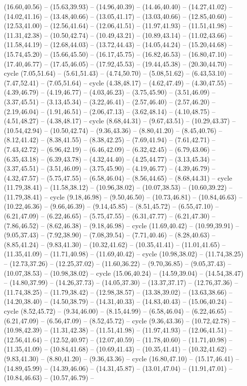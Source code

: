 {(16.60,40.56) -- (15.63,39.93) -- (14.96,40.39) -- (14.46,40.40) -- (14.27,41.02) -- (14.02,41.16) -- (13.48,40.66) -- (13.05,41.17) -- (13.03,40.66) -- (12.85,40.60) -- (12.53,41.00) -- (12.56,41.64) -- (12.06,41.51) -- (11.97,41.93) -- (11.51,41.98) -- (11.31,42.38) -- (10.50,42.74) -- (10.49,43.21) -- (10.89,43.14) -- (11.02,43.66) -- (11.58,44.19) -- (12.68,44.03) -- (13.72,44.43) -- (14.05,44.24) -- (15.20,44.68) -- (15.74,45.20) -- (15.66,45.50) -- (16.17,45.75) -- (16.82,46.53) -- (16.80,47.10) -- (17.40,46.77) -- (17.45,46.05) -- (17.92,45.53) -- (19.44,45.38) -- (20.30,44.70) -- cycle (7.05,51.64) -- (5.61,51.43) -- (4.74,50.70) -- (5.08,51.62) -- (6.43,53.10) -- (7.47,52.41) -- (7.05,51.64) -- cycle (4.38,48.17) -- (4.62,47.49) -- (4.30,47.55) -- (4.39,46.79) -- (4.19,46.77) -- (4.03,46.23) -- (3.75,45.90) -- (3.51,46.09) -- (3.37,45.51) -- (3.13,45.34) -- (3.22,46.41) -- (2.57,46.40) -- (2.57,46.20) -- (2.19,46.04) -- (1.91,46.51) -- (2.06,47.13) -- (3.62,48.14) -- (4.10,48.75) -- (4.51,48.27) -- (4.38,48.17) -- cycle (8.68,44.31) -- (9.67,43.51) -- (10.29,43.37) -- (10.54,42.94) -- (10.50,42.74) -- (9.36,43.36) -- (8.80,41.20) -- (8.45,40.76) -- (8.12,41.42) -- (8.38,41.55) -- (8.38,42.25) -- (7.69,41.94) -- (7.61,42.71) -- (7.43,42.72) -- (6.96,42.19) -- (6.46,42.09) -- (6.32,42.45) -- (6.79,43.06) -- (6.35,43.18) -- (6.39,43.78) -- (4.32,44.40) -- (4.25,44.77) -- (3.13,45.34) -- (3.37,45.51) -- (3.51,46.09) -- (3.75,45.90) -- (4.19,46.77) -- (4.39,46.79) -- (4.32,47.57) -- (5.75,47.55) -- (6.58,46.04) -- (8.56,44.65) -- (8.68,44.31) -- cycle (11.79,38.41) -- (11.58,38.12) -- (10.96,38.02) -- (10.07,38.53) -- (10.60,39.22) -- (11.79,38.41) -- cycle (9.18,46.98) -- (9.50,46.50) -- (10.73,46.81) -- (10.84,46.63) -- (10.22,46.36) -- (9.66,46.39) -- (9.14,45.85) -- (8.51,45.72) -- (6.55,47.10) -- (6.21,47.09) -- (6.22,46.65) -- (5.75,47.55) -- (6.31,47.77) -- (6.21,47.30) -- (7.86,46.52) -- (8.62,46.38) -- (9.18,46.98) -- cycle (11.69,40.42) -- (10.99,39.91) -- (9.05,37.43) -- (7.92,38.90) -- (7.08,39.54) -- (7.71,40.46) -- (8.28,40.63) -- (8.85,41.24) -- (9.83,41.30) -- (10.32,41.62) -- (10.35,41.41) -- (11.01,41.65) -- (11.35,41.09) -- (11.71,40.98) -- (11.69,40.42) -- cycle (10.98,38.02) -- (11.74,38.25) -- (12.73,37.26) -- (12.25,37.02) -- (11.60,36.22) -- (9.70,36.85) -- (9.05,37.43) -- (10.07,38.53) -- (10.98,38.02) -- cycle (15.06,40.24) -- (14.59,39.04) -- (14.54,38.47) -- (14.80,37.99) -- (14.26,37.73) -- (14.05,37.30) -- (13.37,37.17) -- (12.76,37.36) -- (11.74,38.25) -- (11.79,38.42) -- (12.98,38.57) -- (13.38,39.02) -- (13.63,38.66) -- (14.20,38.40) -- (14.50,38.79) -- (14.31,40.33) -- (14.83,40.43) -- (15.06,40.24) -- cycle (8.52,45.72) -- (9.34,46.00) -- (8.15,44.99) -- (6.58,46.04) -- (6.22,46.65) -- (6.21,47.09) -- (6.56,47.09) -- (8.52,45.72) -- cycle (9.36,43.36) -- (10.72,42.78) -- (10.98,42.39) -- (11.31,42.38) -- (11.51,41.98) -- (11.97,41.93) -- (12.06,41.51) -- (12.56,41.64) -- (12.52,40.97) -- (12.07,40.59) -- (11.78,40.60) -- (11.71,40.98) -- (11.35,41.09) -- (10.84,41.68) -- (10.69,41.43) -- (10.35,41.41) -- (10.32,41.62) -- (9.83,41.30) -- (8.80,41.20) -- (9.36,43.36) -- cycle (16.80,47.10) -- (15.17,46.41) -- (14.89,45.99) -- (14.39,46.06) -- (14.31,45.87) -- (13.01,47.04) -- (11.91,47.01) -- (10.84,46.63) -- (10.57,46.79) -- }
